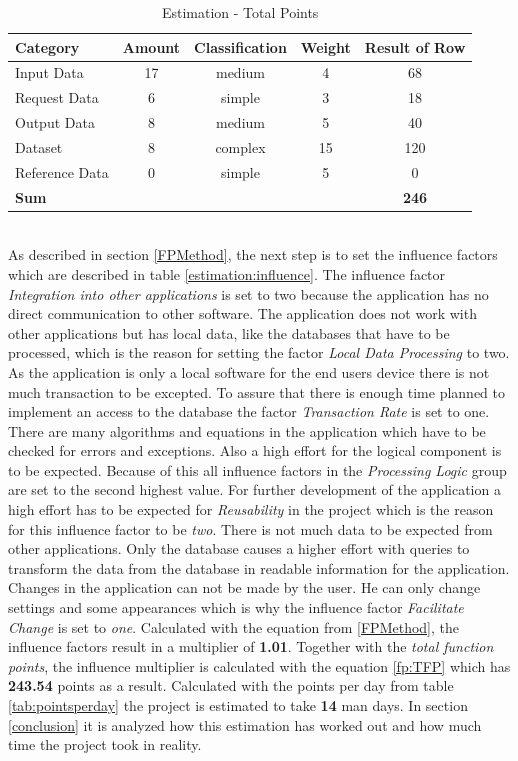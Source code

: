 \begin{table}[h]
	\centering 
	\setlength{\tabcolsep}{4pt}
	\begin{tabular}{|l|c|c|c|c|}\hline
		Category		&  Amount 		&  Classification	&  Weight 	& Result of Row\\ \hline
		Input Data   	& 17      		& medium  			& 4			& 68	\\ \hline
		Request Data   	& 6      		& simple  			& 3			& 18	\\ \hline
		Output Data   	& 8      		& medium  			& 5			& 40	\\ \hline
		Dataset   		& 8      		& complex  			& 15		& 120	\\ \hline
		Reference Data  & 0      		& simple  			& 5			& 0	\\ \hline
		\textbf{Sum}   			&       		&   				& 			& \textbf{246}	\\ \hline
	\end{tabular} 
	\caption{Estimation - Total Points} 
	\label{estimation:data} 
\end{table}\\
As described in section \ref{FPMethod}, the next step is to set the influence factors which are described in table \ref{estimation:influence}. The influence factor \textit{Integration into other applications} is set to two because the application has no direct communication to other software. The application does not work with other applications but has local data, like the databases that have to be processed, which is the reason for setting the factor \textit{Local Data Processing} to two. As the application is only a local software for the end users device there is not much transaction to be excepted. To assure that there is enough time planned to implement an access to the database the factor \textit{Transaction Rate} is set to one. There are many algorithms and equations in the application which have to be checked for errors and exceptions. Also a high effort for the logical component is to be expected. Because of this all influence factors in the \textit{Processing Logic} group are set to the second highest value. For further development of the application a high effort has to be expected for \textit{Reusability} in the project which is the reason for this influence factor to be \textit{two}. There is not much data to be expected from other applications. Only the database causes a higher effort with queries to transform the data from the database in readable information for the application. Changes in the application can not be made by the user. He can only change settings and some appearances which is why the influence factor \textit{Facilitate Change} is set to \textit{one}. Calculated with the equation from \ref{FPMethod}, the influence factors result in a multiplier of \textbf{1.01}. Together with the \textit{total function points}, the influence multiplier is calculated with the equation \ref{fp:TFP} which has \textbf{243.54} points as a result. Calculated with the points per day from table \ref{tab:pointsperday} the project is estimated to take \textbf{14} man days. In section \ref{conclusion} it is analyzed how this estimation has worked out and how much time the project took in reality.\\
